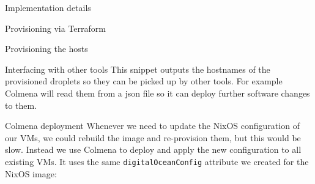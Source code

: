 \begin{frame}[fragile]{Implementation details}
\begin{block}{Provisioning via Terraform}
\begin{block}{Provisioning the hosts}
\begin{Shaded}
\begin{Highlighting}[]
\NormalTok{    inline = [}
\NormalTok{    ]}
\NormalTok{  \}}

\NormalTok{    inline = [}
\NormalTok{    ]}
\NormalTok{  \}}

\NormalTok{    replace\_triggered\_by = [}
\NormalTok{    ]}
\NormalTok{  \}}
\NormalTok{\}}

\NormalTok{\}}
\end{Highlighting}
\end{Shaded}
\end{block}

\begin{block}{Interfacing with other tools}
\protect\hypertarget{interfacing-with-other-tools}{}
This snippet outputs the hostnames of the provisioned droplets so they
can be picked up by other tools. For example Colmena will read them from
a json file so it can deploy further software changes to them.

\begin{Shaded}
\begin{Highlighting}[]


\NormalTok{\}}

\NormalTok{\}}
\end{Highlighting}
\end{Shaded}
\end{block}
\end{block}

\begin{block}{Colmena deployment}
\protect\hypertarget{colmena-deployment}{}
Whenever we need to update the NixOS configuration of our VMs, we could
rebuild the image and re-provision them, but this would be slow. Instead
we use Colmena to deploy and apply the new configuration to all existing
VMs. It uses the same \texttt{digitalOceanConfig} attribute we created
for the NixOS image:


\end{block}
\end{frame}
